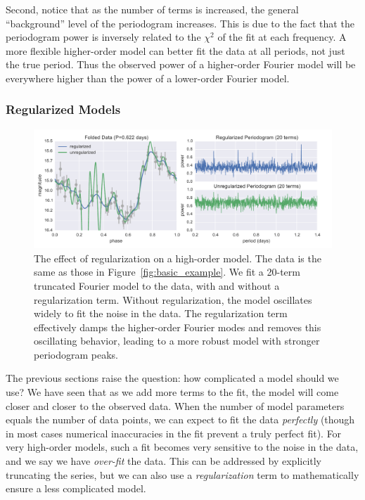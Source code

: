 \documentclass[12pt,preprint]{aastex}
\newcommand{\Fig}[1]{Figure~\ref{fig:#1}}
\newcommand{\fig}[1]{\Fig{#1}}
\newcommand{\figlabel}[1]{\label{fig:#1}}
\begin{document}
Second, notice that as the number of terms is increased, the general ``background'' level of the periodogram increases. This is due to the fact that the periodogram power is inversely related to the $\chi^2$ of the fit at each frequency. A more flexible higher-order model can better fit the data at all periods, not just the true period. Thus the observed power of a higher-order Fourier model will be everywhere higher than the power of a lower-order Fourier model.

\subsubsection{Regularized Models \label{regularization}}


\begin{figure}
  \centering
  \includegraphics[width=\textwidth]{fig04.pdf}
  \caption{
    The effect of regularization on a high-order model. The data is the same as
    those in \fig{basic_example}. We fit a 20-term truncated Fourier model to
    the data, with and without a regularization term. Without regularization,
    the model oscillates widely to fit the noise in the data. The
    regularization term effectively damps the higher-order Fourier modes and
    removes this oscillating behavior, leading to a more robust model with
    stronger periodogram peaks.
  }
  \figlabel{regularized_example}
\end{figure}

The previous sections raise the question: how complicated a model should we use? We have seen that as we add more terms to the fit, the model will come closer and closer to the observed data. When the number of model parameters equals the number of data points, we can expect to fit the data {\it perfectly} (though in most cases numerical inaccuracies in the fit prevent a truly perfect fit). For very high-order models, such a fit becomes very sensitive to the noise in the data, and we say we have {\it over-fit} the data. This can be addressed by explicitly truncating the series, but we can also use a {\it regularization} term to mathematically ensure a less complicated model.
\end{document}
